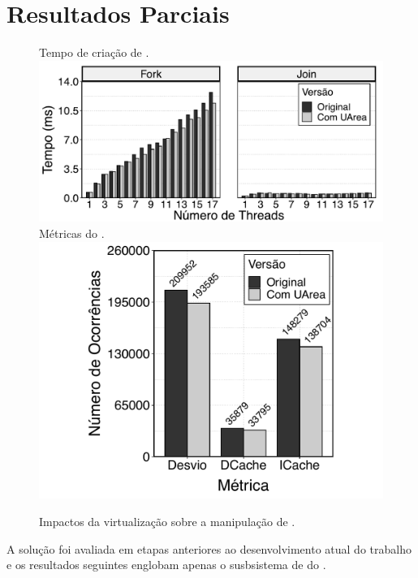 
\chapter{Resultados Parciais}
\label{chap.results}

\begin{figure}[t]
	\centering
                   {Tempo de criação de \threads.}
                   {\includegraphics[width=\textwidth]{content/images/fork-join-kernel-time-bars.pdf}}
	\qquad
                   {Métricas do .}
                   {\includegraphics[width=\textwidth]{content/images/fork-join-kernel-counters.pdf}}
	\caption{Impactos da virtualização sobre a manipulação de \threads.\label{fig.threads}}%
\end{figure}

A solução foi avaliada em etapas anteriores ao desenvolvimento atual do trabalho e os resultados seguintes englobam apenas o susbsistema de \threads do \nanvix. 

